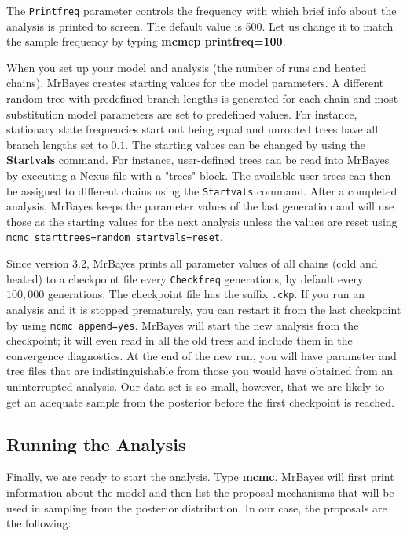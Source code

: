 \documentclass[12pt]{book}
\begin{document}
The \texttt{Printfreq} parameter controls the frequency with which brief info about the analysis is printed
 to screen. The default value is 500. Let us change it to match the sample frequency by typing 
 \textbf{mcmcp printfreq=100}.

When you set up your model and analysis (the number of runs and heated chains), MrBayes creates starting
 values for the model parameters. A different random tree with predefined branch lengths is generated for
 each chain and most substitution model parameters are set to predefined values. For instance, stationary
 state frequencies start out being equal and unrooted trees have all branch lengths set to $0.1$. The 
 starting values can be changed by using the \textbf{Startvals} command. For instance, user-defined trees
 can be read into MrBayes by executing a Nexus file with a "trees" block. The available user trees can then
 be assigned to different chains using the \texttt{Startvals} command. After a completed analysis, MrBayes
 keeps the parameter values of the last generation and will use those as the starting values for the next
 analysis unless the values are reset using \texttt{mcmc starttrees=random startvals=reset}.

Since version 3.2, MrBayes prints all parameter values of all chains (cold and heated) to a checkpoint file
 every \texttt{Checkfreq} generations, by default every $100,000$ generations. The checkpoint file has the
 suffix \texttt{.ckp}. If you run an analysis and it is stopped prematurely, you can restart it from the
 last checkpoint by using \texttt{mcmc append=yes}. MrBayes will start the new analysis from the checkpoint;
 it will even read in all the old trees and include them in the convergence diagnostics. At the end of the
 new run, you will have parameter and tree files that are indistinguishable from those you would have
 obtained from an uninterrupted analysis. Our data set is so small, however, that we are likely to get an
 adequate sample from the posterior before the first checkpoint is reached.

\subsection{Running the Analysis}

Finally, we are ready to start the analysis. Type \textbf{mcmc}. MrBayes will first print information about
 the model and then list the proposal mechanisms that will be used in sampling from the posterior 
 distribution. In our case, the proposals are the following:
\end{document}

